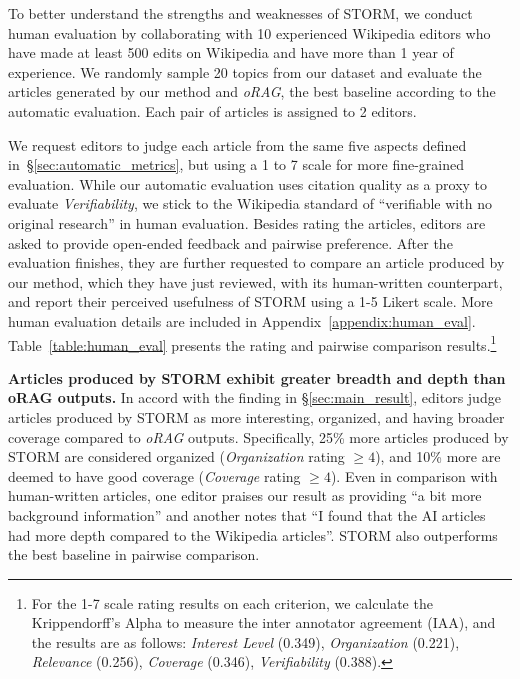 \documentclass[11pt]{article}
\newcommand{\system}[0]{STORM\xspace}
\newcommand{\refsec}[1]{\S\ref{#1}} %
\newcommand{\reftab}[1]{Table~\ref{#1}}
\begin{document}
To better understand the strengths and weaknesses of \system, we conduct human evaluation by collaborating with 10 experienced Wikipedia editors who have made at least 500 edits on Wikipedia and have more than 1 year of experience. We randomly sample 20 topics from our dataset and evaluate the articles generated by our method and \textit{oRAG}, the best baseline according to the automatic evaluation. Each pair of articles is assigned to 2 editors.

We request editors to judge each article from the same five aspects defined in~\refsec{sec:automatic_metrics}, but using a 1 to 7 scale for more fine-grained evaluation. While our automatic evaluation uses citation quality as a proxy to evaluate \textit{Verifiability}, we stick to the Wikipedia standard of ``verifiable with no original research'' in human evaluation. 
Besides rating the articles, editors are asked to provide open-ended feedback and pairwise preference. After the evaluation finishes, they are further requested to compare an article produced by our method, which they have just reviewed, with its human-written counterpart, and report their perceived usefulness of \system using a 1-5 Likert scale. More human evaluation details are included in Appendix~\ref{appendix:human_eval}. \reftab{table:human_eval} presents the rating and pairwise comparison results.\footnote{For the 1-7 scale rating results on each criterion, we calculate the Krippendorff's Alpha to measure the inter annotator agreement (IAA), and the results are as follows: \textit{Interest Level} (0.349), \textit{Organization} (0.221), \textit{Relevance} (0.256), \textit{Coverage} (0.346), \textit{Verifiability} (0.388).}

\noindent
\textbf{Articles produced by \system exhibit greater breadth and depth than oRAG outputs.} In accord with the finding in %
\refsec{sec:main_result}, editors judge articles produced by \system as more interesting, organized, and having broader coverage compared to %
\textit{oRAG} outputs. Specifically, 25\% more articles produced by \system are considered organized (\textit{Organization} rating $\geq 4$), and 10\% more are deemed to have good coverage (\textit{Coverage} rating $\geq 4$). Even in comparison with human-written articles, one editor praises our result as providing ``a bit more background information'' and another notes that ``I found that the AI articles had more depth compared to the Wikipedia articles''. \system also outperforms the best baseline in pairwise comparison.
\end{document}
